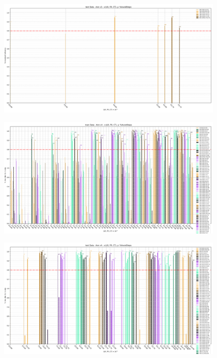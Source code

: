 \newpage
\thispagestyle{empty}

\begin{figure}[H]
    \centering
    \includegraphics[scale=0.55,rotate=-90]{figures/test_annv3_2d.png}
    \caption{}
    \label{fig:TestV3}
\end{figure}

\newpage
\thispagestyle{empty}

\begin{figure}[H]
    \centering
    \includegraphics[scale=0.55,rotate=-90]{figures/train_annv4_2d.png}
    \caption{}
    \label{fig:TrainV4}
\end{figure}

\newpage
\thispagestyle{empty}

\begin{figure}[H]
    \centering
    \includegraphics[scale=0.55,rotate=-90]{figures/test_annv4_2d.png}
    \caption{}
    \label{fig:TestV4}
\end{figure}

